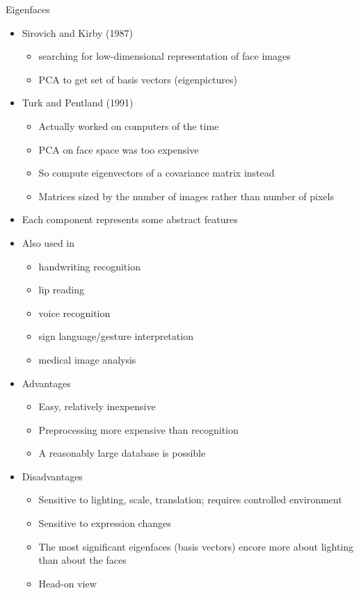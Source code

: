 Eigenfaces
\begin{itemize}
\item Sirovich and Kirby (1987)
\begin{itemize}
\item searching for low-dimensional representation of face images
\item PCA to get set of basis vectors (eigenpictures)
\end{itemize}
\item Turk and Pentland (1991)
\begin{itemize}
\item Actually worked on computers of the time
\item PCA on face space was too expensive
\item So compute eigenvectors of a covariance matrix instead
\item Matrices sized by the number of images rather than number of pixels
\end{itemize}
\item Each component represents some abstract features
\item Also used in
\begin{itemize}
\item handwriting recognition
\item lip reading
\item voice recognition
\item sign language/gesture interpretation
\item medical image analysis
\end{itemize}
\item Advantages
\begin{itemize}
\item Easy, relatively inexpensive
\item Preprocessing more expensive than recognition
\item A reasonably large database is possible
\end{itemize}
\item Disadvantages
\begin{itemize}
\item Sensitive to lighting, scale, translation; requires controlled environment
\item Sensitive to expression changes
\item The most significant eigenfaces (basis vectors) encore more about lighting than about the faces
\item Head-on view
\end{itemize}
\end{itemize}




